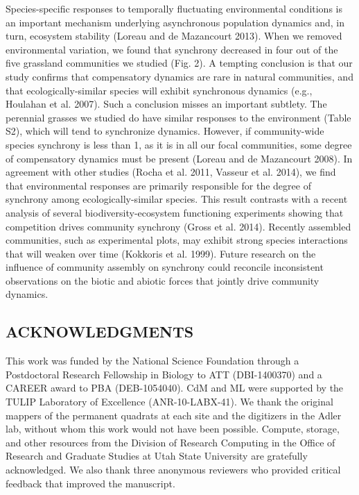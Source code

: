 \documentclass[12pt,]{article}
\begin{document}
Species-specific responses to temporally fluctuating environmental
conditions is an important mechanism underlying asynchronous population
dynamics and, in turn, ecosystem stability (Loreau and {{de Mazancourt}}
2013). When we removed environmental variation, we found that synchrony
decreased in four out of the five grassland communities we studied (Fig.
2). A tempting conclusion is that our study confirms that compensatory
dynamics are rare in natural communities, and that ecologically-similar
species will exhibit synchronous dynamics (e.g., Houlahan et al. 2007).
Such a conclusion misses an important subtlety. The perennial grasses we
studied do have similar responses to the environment (Table S2), which
will tend to synchronize dynamics. However, if community-wide species
synchrony is less than 1, as it is in all our focal communities, some
degree of compensatory dynamics must be present (Loreau and {{de
Mazancourt}} 2008). In agreement with other studies (Rocha et al. 2011,
Vasseur et al. 2014), we find that environmental responses are primarily
responsible for the degree of synchrony among ecologically-similar
species. This result contrasts with a recent analysis of several
biodiversity-ecosystem functioning experiments showing that competition
drives community synchrony (Gross et al. 2014). Recently assembled
communities, such as experimental plots, may exhibit strong species
interactions that will weaken over time (Kokkoris et al. 1999). Future
research on the influence of community assembly on synchrony could
reconcile inconsistent observations on the biotic and abiotic forces
that jointly drive community dynamics.

\subsection{ACKNOWLEDGMENTS}\label{acknowledgments}

This work was funded by the National Science Foundation through a
Postdoctoral Research Fellowship in Biology to ATT (DBI-1400370) and a
CAREER award to PBA (DEB-1054040). CdM and ML were supported by the
TULIP Laboratory of Excellence (ANR-10-LABX-41). We thank the original
mappers of the permanent quadrats at each site and the digitizers in the
Adler lab, without whom this work would not have been possible. Compute,
storage, and other resources from the Division of Research Computing in
the Office of Research and Graduate Studies at Utah State University are
gratefully acknowledged. We also thank three anonymous reviewers who
provided critical feedback that improved the manuscript.
\end{document}
